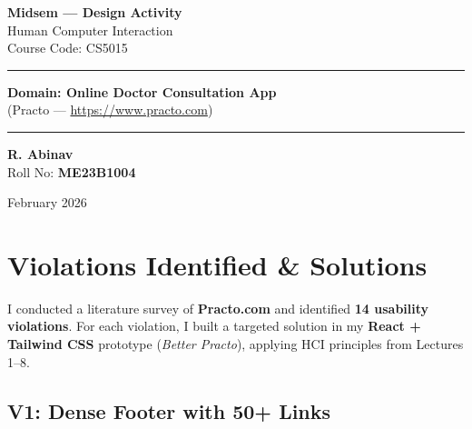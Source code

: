 \documentclass[12pt, a4paper]{article}
\begin{document}
\begin{titlepage}
\centering
\vspace*{2cm}

{\Huge\bfseries\color{primary} Midsem --- Design Activity}\\[0.8cm]
{\LARGE\color{primary!70!black} Human Computer Interaction}\\[0.3cm]
{\large Course Code: CS5015}

\vspace{1.5cm}

\rule{\textwidth}{1pt}
\vspace{0.5cm}

{\Large\bfseries Domain: Online Doctor Consultation App}\\[0.3cm]
{\large (Practo --- \url{https://www.practo.com})}

\vspace{0.5cm}
\rule{\textwidth}{1pt}

\vspace{2cm}

{\Large\bfseries R. Abinav}\\[0.3cm]
{\large Roll No: \textbf{ME23B1004}}

\vspace{2cm}

\vfill
{\small February 2026}
\end{titlepage}

\tableofcontents
\newpage

\section{Violations Identified \& Solutions}

I conducted a literature survey of \textbf{Practo.com} and identified \textbf{14 usability violations}. For each violation, I built a targeted solution in my \textbf{React + Tailwind CSS} prototype (\textit{Better Practo}), applying HCI principles from Lectures 1--8.

\vspace{0.5cm}

\subsection{V1: Dense Footer with 50+ Links}
\end{document}
